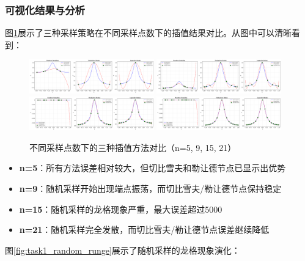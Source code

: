\documentclass[a4paper,12pt]{article}
\theoremstyle{definition}
\begin{document}
\subsubsection{可视化结果与分析}

图\ref{fig:task1_comparison}展示了三种采样策略在不同采样点数下的插值结果对比。从图中可以清晰看到：

\begin{figure}[H]
\centering
\includegraphics[width=0.48\textwidth]{results/task1/comparison_n5.png}
\includegraphics[width=0.48\textwidth]{results/task1/comparison_n9.png}
\includegraphics[width=0.48\textwidth]{results/task1/comparison_n15.png}
\includegraphics[width=0.48\textwidth]{results/task1/comparison_n21.png}
\caption{不同采样点数下的三种插值方法对比（n=5, 9, 15, 21）}
\label{fig:task1_comparison}
\end{figure}

\begin{itemize}
    \item \textbf{n=5}：所有方法误差相对较大，但切比雪夫和勒让德节点已显示出优势
    \item \textbf{n=9}：随机采样开始出现端点振荡，而切比雪夫/勒让德节点保持稳定
    \item \textbf{n=15}：随机采样的龙格现象严重，最大误差超过5000
    \item \textbf{n=21}：随机采样完全发散，而切比雪夫/勒让德节点误差继续降低
\end{itemize}

图\ref{fig:task1_random_runge}展示了随机采样的龙格现象演化：
\end{document}
